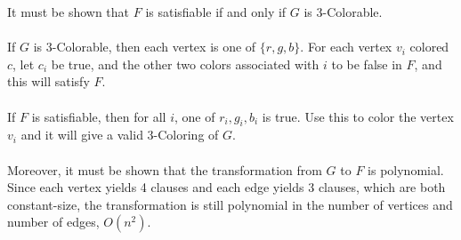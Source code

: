 \documentclass[letterpaper,notitlepage,twoside]{article}
\begin{document}
It must be shown that $F$ is satisfiable if and only if $G$ is 3-Colorable.
\\\\
If $G$ is 3-Colorable, then each vertex is one of $\{r, g, b\}$. For each vertex $v_i$ colored $c$, let $c_i$ be true, and the other two colors associated with $i$ to be false in $F$, and this will satisfy $F$.
\\\\
If $F$ is satisfiable, then for all $i$, one of $r_i, g_i, b_i$ is true. Use this to color the vertex $v_i$ and it will give a valid 3-Coloring of $G$.
\\\\
Moreover, it must be shown that the transformation from $G$ to $F$ is polynomial. Since each vertex yields 4 clauses and each edge yields 3 clauses, which are both constant-size, the transformation is still polynomial in the number of vertices and number of edges, $O(n^2)$.
\end{document}
